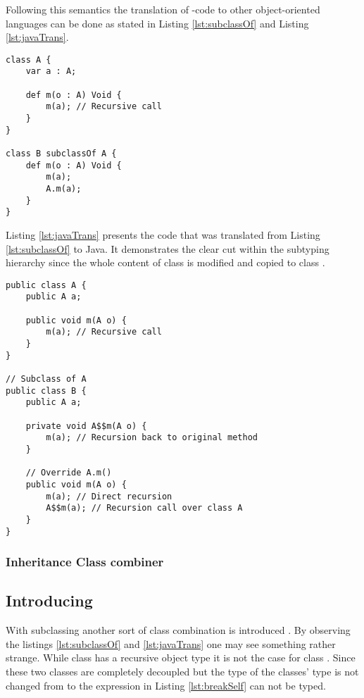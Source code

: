 Following this semantics the translation of \ooplss-code to
other object-oriented languages can be done as stated in Listing
\ref{lst:subclassOf} and Listing \ref{lst:javaTrans}.

\begin{lstlisting}[float,language=ooplss,caption=Subclassing in \ooplss,label=lst:subclassOf]
class A {
	var a : A;

	def m(o : A) Void {
		m(a); // Recursive call
	}
}

class B subclassOf A {
	def m(o : A) Void {
		m(a);
		A.m(a);
	}
}
\end{lstlisting}

Listing \ref{lst:javaTrans} presents the code that was translated from Listing 
\ref{lst:subclassOf} to Java. It demonstrates the clear cut within 
the subtyping hierarchy since the whole content of class \A is modified
and copied to class \B.

\begin{lstlisting}[float,caption=Subclassing translated to Java,label=lst:javaTrans]
public class A {
	public A a;

	public void m(A o) {
		m(a); // Recursive call
	}
}

// Subclass of A
public class B {
	public A a;

	private void A$$m(A o) {
		m(a); // Recursion back to original method
	}

	// Override A.m()
	public void m(A o) {
		m(a); // Direct recursion
		A$$m(a); // Recursion call over class A
	}
}
\end{lstlisting}

\subsubsection{Inheritance Class combiner}

\subsection{Introducing \mytype}
With subclassing another sort of class combination is introduced
. By
observing the listings \ref{lst:subclassOf} and \ref{lst:javaTrans}
one may see something rather strange. While class \A has a recursive
object type it is not the case for class \B. Since these two classes are
completely decoupled but the type of the classes' type is not changed from
\A to \B the expression in Listing \ref{lst:breakSelf} can not be typed.


